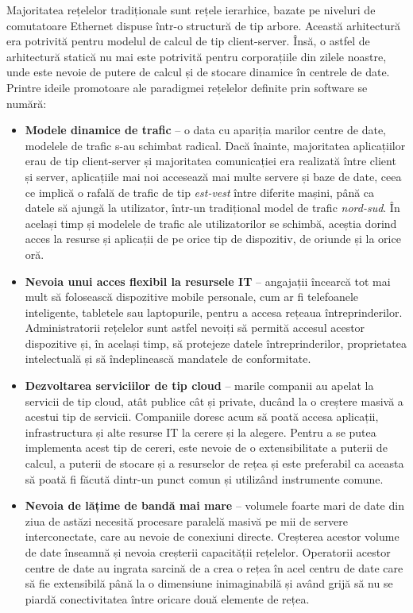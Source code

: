 Majoritatea rețelelor tradiționale sunt rețele ierarhice, bazate pe niveluri de comutatoare Ethernet dispuse într-o structură de tip arbore. Această arhitectură era potrivită pentru modelul de calcul de tip client-server. Însă, o astfel de arhitectură statică nu mai este potrivită pentru corporațiile din zilele noastre, unde este nevoie de putere de calcul și de stocare dinamice în centrele de date. Printre ideile promotoare ale paradigmei rețelelor definite prin software se numără:
\begin{itemize}
	\item \textbf{Modele dinamice de trafic} – o data cu apariția marilor centre de date, modelele de trafic s-au schimbat radical. Dacă înainte, majoritatea aplicațiilor erau de tip client-server și majoritatea comunicației era realizată între client și server, aplicațiile mai noi accesează mai multe servere și baze de date, ceea ce implică o rafală de trafic de tip \textit{est-vest} între diferite mașini, până ca datele să ajungă la utilizator, într-un tradițional model de trafic \textit{nord-sud}. În același timp și modelele de trafic ale utilizatorilor se schimbă, aceștia dorind acces la resurse și aplicații de pe orice tip de dispozitiv, de oriunde și la orice oră.
	\item \textbf{Nevoia unui acces flexibil la resursele IT} – angajații încearcă tot mai mult să folosească dispozitive mobile personale, cum ar fi telefoanele inteligente, tabletele sau laptopurile, pentru a accesa rețeaua întreprinderilor. Administratorii rețelelor sunt astfel nevoiți să permită accesul acestor dispozitive și, în același timp, să protejeze datele întreprinderilor, proprietatea intelectuală și să îndeplinească mandatele de conformitate.
	\item \textbf{Dezvoltarea serviciilor de tip cloud} – marile companii au apelat la servicii de tip cloud, atât publice cât și private, ducând la o creștere masivă a acestui tip de servicii. Companiile doresc acum să poată accesa aplicații, infrastructura și alte resurse IT la cerere și la alegere. Pentru a se putea implementa acest tip de cereri, este nevoie de o extensibilitate a puterii de calcul, a puterii de stocare și a resurselor de rețea și este preferabil ca aceasta să poată fi făcută dintr-un punct comun și utilizând instrumente comune.
	\item \textbf{Nevoia de lățime de bandă mai mare} – volumele foarte mari de date din ziua de astăzi necesită procesare paralelă masivă pe mii de servere interconectate, care au nevoie de conexiuni directe. Creșterea acestor volume de date înseamnă și nevoia creșterii capacității rețelelor. Operatorii acestor centre de date au ingrata sarcină de a crea o rețea în acel centru de date care să fie extensibilă până la o dimensiune inimaginabilă și având grijă să nu se piardă conectivitatea între oricare două elemente de rețea.	
\end{itemize}

